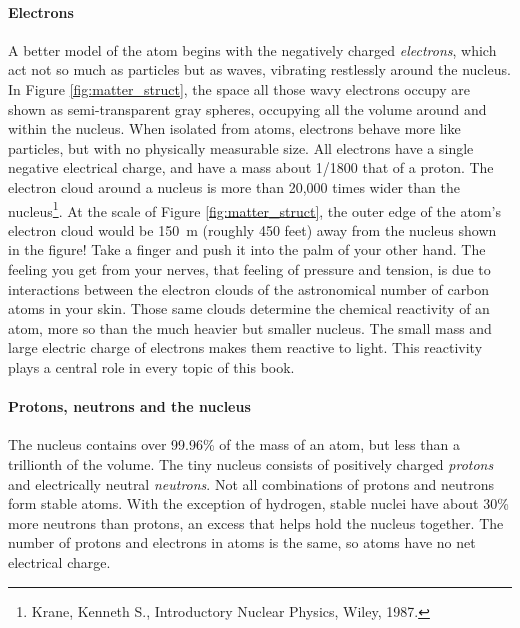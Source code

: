 \documentclass[amstex,12pt]{book}
\begin{document}
\paragraph{Electrons}
A better model of the atom begins with the negatively charged \emph{electrons}, which act not so much as particles but as waves, vibrating restlessly around the nucleus. In Figure \ref{fig:matter_struct}, the space all those wavy electrons occupy are shown as semi-transparent gray spheres, occupying all the volume around and within the nucleus. When isolated from atoms, electrons behave more like particles, but with no physically measurable size. All electrons have a single negative electrical charge, and have a mass about 1/1800 that of a proton. The electron cloud around a nucleus is more than 20,000 times wider than the nucleus\footnote{Krane, Kenneth S., Introductory Nuclear Physics, Wiley, 1987.}. At the scale of Figure \ref{fig:matter_struct}, the outer edge of the atom’s electron cloud would be \SI{150}{m} (roughly 450 feet) away from the nucleus shown in the figure! Take a finger and push it into the palm of your other hand. The feeling you get from your nerves, that feeling of pressure and tension, is due to interactions between the electron clouds of the astronomical number of carbon atoms in your skin. Those same clouds determine the chemical reactivity of an atom, more so than the much heavier but smaller nucleus. The small mass and large electric charge of electrons makes them reactive to light. This reactivity plays a central role in every topic of this book. 

\paragraph{Protons, neutrons and the nucleus}
The nucleus contains over 99.96\% of the mass of an atom, but less than a trillionth of the volume. The tiny nucleus consists of positively charged \emph{protons} and electrically neutral \emph{neutrons}. Not all combinations of protons and neutrons form stable atoms. With the exception of hydrogen, stable nuclei have about 30\% more neutrons than protons, an excess that helps hold the nucleus together. The number of protons and electrons in atoms is the same, so atoms have no net electrical charge.\\
\end{document}
